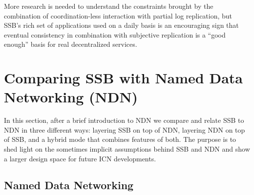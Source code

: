 \documentclass[9pt,sigconf]{acmart}
\begin{document}
More research is needed to understand the constraints brought by the combination of
coordination-less interaction with partial log replication, but SSB's
rich set of applications used on a daily basis is an encouraging sign
that eventual consistency in combination with subjective replication
is a ``good enough'' basis for real decentralized services.





\section{Comparing SSB with Named Data Networking (NDN)}
\label{sect:NDN}

In this section, after a brief introduction to NDN we compare and relate SSB to NDN in three different ways: layering SSB on top of NDN, layering NDN on top
of SSB, and a hybrid mode that combines features of both. The purpose is to shed light on the sometimes implicit assumptions behind SSB and NDN and show a larger design space for future ICN developments.

\subsection{Named Data Networking}
\end{document}
